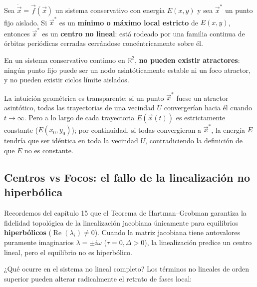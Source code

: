 \begin{theorem}
\label{thm:centros_conservativos}
Sea $\dot{\vec{x}} = \vec{f}(\vec{x})$ un sistema conservativo con energía $E(x,y)$ y sea $\vec{x}^*$ un punto fijo aislado. Si $\vec{x}^*$ es un \textbf{mínimo o máximo local estricto} de $E(x,y)$, entonces $\vec{x}^*$ es un \textbf{centro no lineal}: está rodeado por una familia continua de órbitas periódicas cerradas cerrándose concéntricamente sobre él.
\end{theorem}

\begin{theorem}
En un sistema conservativo continuo en $\mathbb{R}^2$, \textbf{no pueden existir atractores}: ningún punto fijo puede ser un nodo asintóticamente estable ni un foco atractor, y no pueden existir ciclos límite aislados.
\end{theorem}

La intuición geométrica es transparente: si un punto $\vec{x}^*$ fuese un atractor asintótico, todas las trayectorias de una vecindad $U$ convergerían hacia él cuando $t \to \infty$. Pero a lo largo de cada trayectoria $E(\vec{x}(t))$ es estrictamente constante ($E(x_0, y_0)$); por continuidad, si todas convergieran a $\vec{x}^*$, la energía $E$ tendría que ser idéntica en toda la vecindad $U$, contradiciendo la definición de que $E$ no es constante.

\subsection{Centros vs Focos: el fallo de la linealización no hiperbólica}

Recordemos del capítulo 15 que el Teorema de Hartman--Grobman garantiza la fidelidad topológica de la linealización jacobiana únicamente para equilibrios \textbf{hiperbólicos} ($\operatorname{Re}(\lambda_i) \neq 0$). Cuando la matriz jacobiana tiene autovalores puramente imaginarios $\lambda = \pm i\omega$ ($\tau = 0, \Delta > 0$), la linealización predice un centro lineal, pero el equilibrio no es hiperbólico.

¿Qué ocurre en el sistema no lineal completo? Los términos no lineales de orden superior pueden alterar radicalmente el retrato de fases local:

